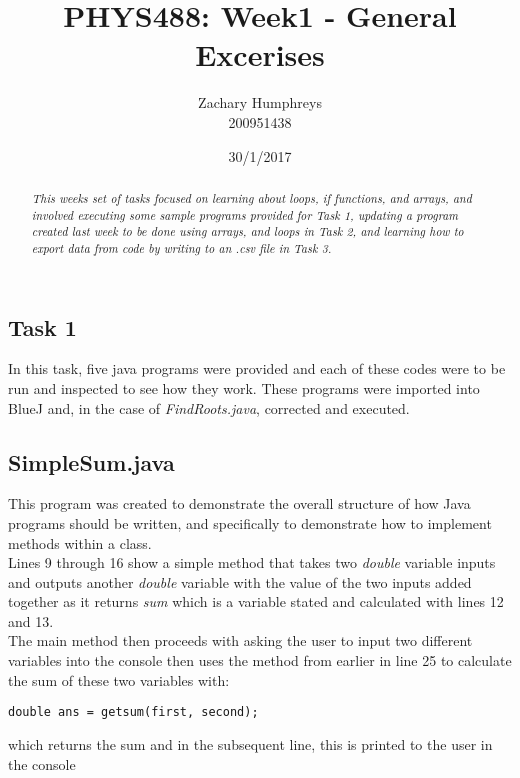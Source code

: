\documentclass{article}
\title{PHYS488: Week1 - General Excerises}
\author{Zachary Humphreys \\ 200951438}
\date{30/1/2017}
\begin{document}
	\maketitle
	\begin{abstract}
		\begin{center}
		\textit{This weeks set of tasks focused on learning about loops, if functions, and arrays, and involved executing some sample programs provided for Task 1, updating a program created last week to be done using arrays, and loops in Task 2, and learning how to export data from code by writing to an .csv file in Task 3.}
		\end{center}
	\end{abstract}
\begin{multicols}{2}
\section{Task 1}
		In this task, five java programs were provided and each of these codes were to be run and inspected to see how they work. These programs were imported into BlueJ and, in the case of \textit{FindRoots.java}, corrected and executed.
		\subsection{SimpleSum.java}
			 This program was created to demonstrate the overall structure of how Java programs should be written, and specifically to demonstrate how to implement methods within a class. \\ \indent Lines 9 through 16 show a simple method that takes two \textit{double} variable inputs and outputs another \textit{double} variable with the value of the two inputs added together as it returns \textit{sum} which is a variable stated and calculated with lines 12 and 13. \\ \indent The main method then proceeds with asking the user to input two different variables into the console then uses the method from earlier in line 25 to calculate the sum of these two variables with:
			 \begin{lstlisting}
double ans = getsum(first, second);
			 \end{lstlisting} 
			 which returns the sum and in the subsequent line, this is printed to the user in the console

\end{multicols}
\end{document}
